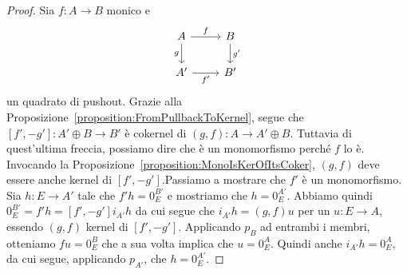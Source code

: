 \begin{proof}
  Sia \(f : A \to B\) monico e
  \[
    \begin{tikzcd}
      A \ar["{g}", d, swap] \ar["{f}", r] & B \ar["{g'}", d] \\
      A' \ar["{f'}", r, swap] & B'
    \end{tikzcd}
  \]
  un quadrato di pushout. Grazie alla
  Proposizione~\ref{proposition:FromPullbackToKernel}, segue che
  \([f', -g'] : A' \oplus B \to B'\) è cokernel di
  \((g, f) : A \to A' \oplus B\). Tuttavia di quest'ultima freccia,
  possiamo dire che è un monomorfismo perché \(f\) lo è. Invocando la
  Proposizione~\ref{proposition:MonoIsKerOfItsCoker}, \((g, f)\) deve
  essere anche kernel di \([f', -g']\).\newline Passiamo a mostrare che
  \(f'\) è un monomorfismo. Sia \(h : E \to A'\) tale che \(f'h = 0_E^{B'}\)
  e mostriamo che \(h = 0_E^{A'}\). Abbiamo quindi
  \(0_E^{B'} = f'h = [f', -g']i_{A'}h\) da cui segue che
  \(i_{A'} h = (g, f) u\) per un \(u : E \to A\), essendo
  \((g, f)\) kernel di \([f', -g']\). Applicando \(p_B\) ad entrambi i
  membri, otteniamo \(fu = 0_E^B\) che a sua volta implica che \(u =
  0_E^A\). Quindi anche \(i_{A'} h = 0_E^A\), da
  cui segue, applicando \(p_{A'}\), che \(h = 0_E^{A'}\).
\end{proof}



